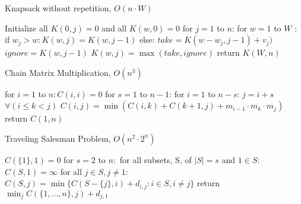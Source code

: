 \documentclass{article}
\begin{document}
\begin{multicols}{2}
\setlength{\textfloatsep}{0.0cm}
\begin{algorithm}[H]
\label{alg:quad}
\caption{Knapsack without repetition, $O(n \cdot W)$}\label{euclid}
\begin{algorithmic}[1]
\State Initialize all $K(0, j) = 0$ and all $K(w, 0) = 0$
\State for $j = 1$ to $n$: 
\Indent 
\State for $w = 1$ to $W$ : 
\Indent 
\State if $w_j > w: K(w, j) = K(w, j-1)$ 
\State else: 
\Indent 
\State $take = K(w-w_j, j-1) + v_j)$
\State $ignore = K(w, j-1)$
\State $K(w, j) = \max(take, ignore)$
\EndIndent 
\EndIndent 
\EndIndent 
\State return $K(W, n)$
\end{algorithmic}
\end{algorithm}
\setlength{\floatsep}{0.0cm}
\setlength{\textfloatsep}{0.0cm}
\begin{algorithm}[H]
\label{alg:quad}
\caption{Chain Matrix Multiplication, $O(n^3)$}\label{euclid}
\begin{algorithmic}[1]
\State for $i = 1$ to $n: C(i, i) = 0$
\State for $s = 1$ to $n - 1$: 
\Indent 
\State for $i = 1$ to $n-s$: 
\Indent 
\State $j = i + s$ 
\State $\forall (i \leq k < j)$ 
\State $C(i, j) = \min(C(i, k) + C(k+1, j) + m_{i-1} \cdot m_k \cdot m_j)$
\EndIndent 
\EndIndent 
\State return $C(1, n)$
\end{algorithmic}
\end{algorithm}

\setlength{\floatsep}{0.0cm}
\setlength{\textfloatsep}{0.0cm}
\begin{algorithm}[H]
\label{alg:quad}
\caption{Traveling Salesman Problem, $O(n^2 \cdot 2^n)$}\label{euclid}
\begin{algorithmic}[1]
\State $C(\{1\}, 1) = 0$ 
\State for $s = 2$ to $n:$ 
\Indent
\State for all subsets, S, of $|S| = s$ and $1 \in S$: 
\Indent 
\State $C(S, 1) = \infty$
\State for all $j \in S, j \neq 1$: 
\Indent 
\State $C(S, j) = \min\{C(S-\{j\},i) + d_{i, j}: i \in S, i \neq j\}$
\EndIndent 
\EndIndent 
\EndIndent 
\State return $\min_j C(\{1, \ldots, n\}, j) + d_{j, 1}$
\end{algorithmic}
\end{algorithm}
\setlength{\floatsep}{0.0cm}

\end{multicols}
\end{document}
